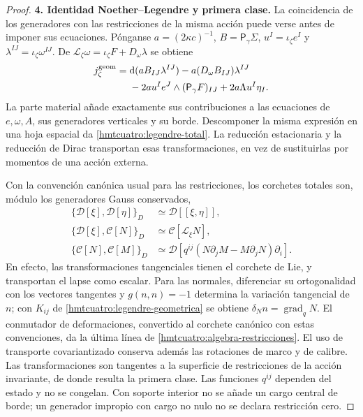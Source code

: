 \begin{proof}
\par\medskip\noindent\textbf{4. Identidad Noether--Legendre y primera clase.}\quad
La coincidencia de los generadores con las restricciones de la misma
acción puede verse antes de imponer sus ecuaciones.
Pónganse \(a=(2\kappa c)^{-1}\), \(B=\mathsf P_\gamma\Sigma\),
\(u^I=\iota_\zeta e^I\) y \(\lambda^{IJ}=\iota_\zeta\omega^{IJ}\).
De \(\mathcal L_\zeta\omega=\iota_\zeta F+D_\omega\lambda\) se obtiene
\begin{equation}
 \begin{split}
 j_\zeta^{\rm geom}
 ={}&\mathrm d(a B_{IJ}\lambda^{IJ})
   -a(D_\omega B_{IJ})\lambda^{IJ}\\
 &-2a u^Ie^J\wedge(\mathsf P_\gamma F)_{IJ}
       +2a\Lambda u^I\eta_I .
 \end{split}
 \label{hmtcuatro:noether-legendre}
\end{equation}
La parte material añade exactamente sus contribuciones a las
ecuaciones de \(e,\omega,A\), sus generadores verticales y su borde.
Descomponer la misma expresión en una hoja espacial da
\eqref{hmtcuatro:legendre-total}. La reducción estacionaria y la
reducción de Dirac transportan esas transformaciones, en vez de
sustituirlas por momentos de una acción externa.

Con la convención canónica usual para las restricciones, los corchetes
totales son, módulo los generadores Gauss conservados,
\begin{equation}
 \begin{aligned}
 \{\mathcal D[\xi],\mathcal D[\eta]\}_D
    &\simeq\mathcal D[[\xi,\eta]],\\
 \{\mathcal D[\xi],\mathcal C[N]\}_D
    &\simeq\mathcal C[\mathcal L_\xi N],\\
 \{\mathcal C[N],\mathcal C[M]\}_D
    &\simeq\mathcal D[
       q^{ij}(N\partial_jM-M\partial_jN)\partial_i].
 \end{aligned}
 \label{hmtcuatro:algebra-restricciones}
\end{equation}
En efecto, las transformaciones tangenciales tienen el corchete de
Lie, y transportan el lapse como escalar. Para las normales,
diferenciar su ortogonalidad con los vectores tangentes y
\(g(n,n)=-1\) determina la variación tangencial de \(n\);
con \(K_{ij}\) de \eqref{hmtcuatro:legendre-geometrica} se obtiene
\(\delta_N n=\operatorname{grad}_qN\). El conmutador de deformaciones,
convertido al corchete canónico con estas convenciones, da la última
línea de \eqref{hmtcuatro:algebra-restricciones}. El uso de transporte
covariantizado conserva además las rotaciones de marco y de calibre.
Las transformaciones son tangentes a la superficie de restricciones
de la acción invariante, de donde resulta la primera clase.
Las funciones \(q^{ij}\) dependen del estado y no se congelan.
Con soporte interior no se añade un cargo central de borde; un
generador impropio con cargo no nulo no se declara restricción cero.


\end{proof}
